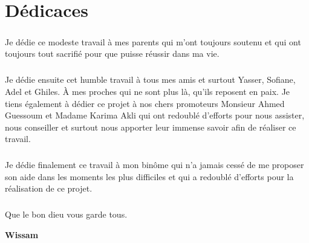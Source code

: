 \chapter*{Dédicaces}    

\vspace{1.5cm}

\paragraph{}
Je dédie ce modeste travail à mes parents qui m'ont toujours soutenu et qui ont toujours tout sacrifié pour que puisse réussir dans ma vie.

\paragraph{}
Je dédie ensuite cet humble travail à tous mes amis et surtout Yasser, Sofiane, Adel et Ghiles. À mes proches qui ne sont plus là, qu'ils reposent en paix. Je tiens également à dédier ce projet à nos chers promoteurs Monsieur Ahmed Guessoum et Madame Karima Akli qui ont redoublé d'efforts pour nous assister, nous conseiller et surtout nous apporter leur immense savoir afin de réaliser ce travail.

\paragraph{}
Je dédie finalement ce travail à mon binôme qui n'a jamais cessé de me proposer son aide dans les moments les plus difficiles et qui a redoublé d'efforts pour la réalisation de ce projet.
\paragraph{}
Que le bon dieu vous garde tous.

\vspace{0.5cm}
\begin{center}
	\Large
	\hspace{12.5cm}
	\textbf{Wissam}
\end{center}